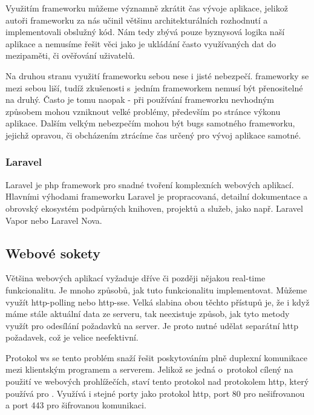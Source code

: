 Využitím \gls{framework}u můžeme významně zkrátit čas vývoje aplikace, jelikož autoři \gls{framework}u za nás učinil většinu architekturálních rozhodnutí a implementovali obslužný kód. Nám tedy zbývá pouze byznysová logika naší aplikace a nemusíme řešit věci jako je ukládání často využívaných dat do mezipaměti, či ověřování uživatelů.

Na druhou stranu využití \gls{framework}u sebou nese i jisté nebezpečí. \Gls{framework}y se mezi sebou liší, tudíž zkušenosti s~jedním \gls{framework}em nemusí být přenositelné na druhý. Často je tomu naopak - při používání \gls{framework}u nevhodným způsobem mohou vzniknout velké problémy, především po stránce výkonu aplikace. Dalším velkým nebezpečím mohou být \glspl{bug} samotného \gls{framework}u, jejichž opravou, či obcházením ztrácíme čas určený pro vývoj aplikace samotné.

\subsubsection{Laravel}
\label{subsub:laravel}

Laravel\cite{laravel} je \acrshort{php} \gls{framework} pro snadné tvoření komplexních webových aplikací. Hlavními výhodami \gls{framework}u Laravel je propracovaná, detailní dokumentace a obrovský ekosystém podpůrných knihoven, projektů a služeb, jako např. Laravel Vapor\cite{laravel-vapor} nebo Laravel Nova\cite{laravel-nova}.

\subsection{Webové sokety}

Většina webových aplikací vyžaduje dříve či později nějakou \gls{real-time} funkcionalitu. Je mnoho způsobů, jak tuto funkcionalitu implementovat. Můžeme využít \Gls{http-polling}\cite{http-polling} nebo \Gls{http-sse}\cite{http-sse}. Velká slabina obou těchto přístupů je, že i když máme stále aktuální data ze serveru, tak neexistuje způsob, jak tyto metody využít pro odesílání požadavků na server. Je proto nutné udělat separátní \acrshort{http} požadavek, což je velice neefektivní.

Protokol \acrfull{ws}\cite{ws} se tento problém snaží řešit poskytováním plně duplexní komunikace mezi klientským programem a serverem. Jelikož se jedná o~protokol cílený na použití ve webových prohlížečích, staví tento protokol nad protokolem \acrshort{http}, který používá pro . Využívá i stejné porty jako protokol \acrshort{http}, port 80 pro nešifrovanou a port 443 pro šifrovanou komunikaci.

